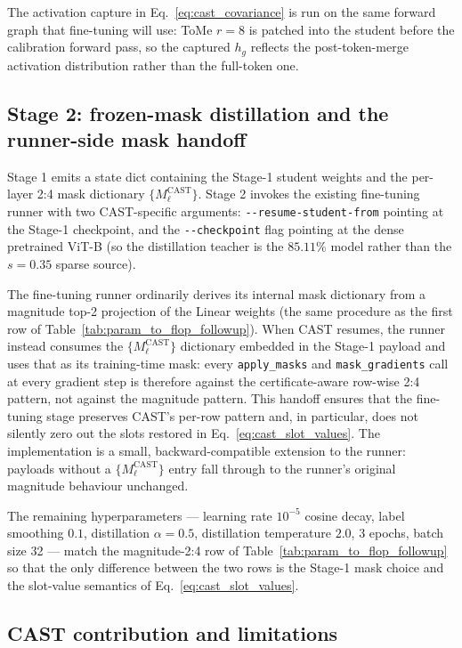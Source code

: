 \documentclass[11pt]{article}
\theoremstyle{plain}
\theoremstyle{definition}
\theoremstyle{remark}
\newcommand{\1}{\mathbf{1}}
\begin{document}
The activation capture in Eq.~\eqref{eq:cast_covariance} is run on the same forward graph that fine-tuning will use: ToMe \(r=8\) is patched into the student before the calibration forward pass, so the captured \(h_g\) reflects the post-token-merge activation distribution rather than the full-token one.

\subsection{Stage 2: frozen-mask distillation and the runner-side mask handoff}
\label{subsec:cast_stage2_meth}

Stage 1 emits a state dict containing the Stage-1 student weights and the per-layer 2:4 mask dictionary \(\{M^{\mathrm{CAST}}_\ell\}\).  Stage 2 invokes the existing fine-tuning runner with two CAST-specific arguments: \texttt{-{}-resume-student-from} pointing at the Stage-1 checkpoint, and the \texttt{-{}-checkpoint} flag pointing at the dense pretrained ViT-B (so the distillation teacher is the \(85.11\%\) model rather than the \(s=0.35\) sparse source).

The fine-tuning runner ordinarily derives its internal mask dictionary from a magnitude top-2 projection of the Linear weights (the same procedure as the first row of Table~\ref{tab:param_to_flop_followup}).  When CAST resumes, the runner instead consumes the \(\{M^{\mathrm{CAST}}_\ell\}\) dictionary embedded in the Stage-1 payload and uses that as its training-time mask: every \texttt{apply\_masks} and \texttt{mask\_gradients} call at every gradient step is therefore against the certificate-aware row-wise 2:4 pattern, not against the magnitude pattern.  This handoff ensures that the fine-tuning stage preserves CAST's per-row pattern and, in particular, does not silently zero out the slots restored in Eq.~\eqref{eq:cast_slot_values}.  The implementation is a small, backward-compatible extension to the runner: payloads without a \(\{M^{\mathrm{CAST}}_\ell\}\) entry fall through to the runner's original magnitude behaviour unchanged.

The remaining hyperparameters --- learning rate \(10^{-5}\) cosine decay, label smoothing \(0.1\), distillation \(\alpha=0.5\), distillation temperature \(2.0\), 3 epochs, batch size 32 --- match the magnitude-2:4 row of Table~\ref{tab:param_to_flop_followup} so that the only difference between the two rows is the Stage-1 mask choice and the slot-value semantics of Eq.~\eqref{eq:cast_slot_values}.

\subsection{CAST contribution and limitations}
\label{subsec:cast_limits}
\end{document}
